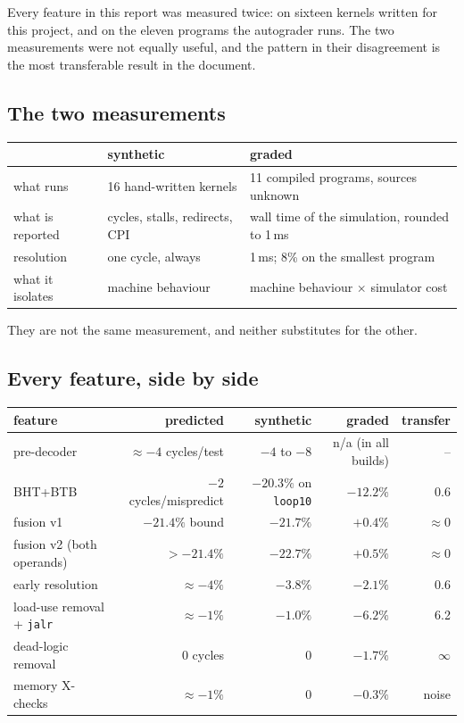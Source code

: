\documentclass[11pt]{article}
\begin{document}
Every feature in this report was measured twice: on sixteen kernels written for this project, and
on the eleven programs the autograder runs. The two measurements were not equally useful, and the
pattern in their disagreement is the most transferable result in the document.

\subsection{The two measurements}

\begin{center}
\small
\begin{tabular}{lll}
\toprule
& synthetic & graded \\
\midrule
what runs & 16 hand-written kernels & 11 compiled programs, sources unknown \\
what is reported & cycles, stalls, redirects, CPI & wall time of the simulation, rounded to 1\,ms \\
resolution & one cycle, always & 1\,ms; 8\% on the smallest program \\
what it isolates & machine behaviour & machine behaviour $\times$ simulator cost \\
\bottomrule
\end{tabular}
\end{center}

They are not the same measurement, and neither substitutes for the other.

\subsection{Every feature, side by side}

\begin{center}
\footnotesize
\setlength{\tabcolsep}{4pt}
\begin{tabular}{lrrrr}
\toprule
feature & predicted & synthetic & graded & transfer \\
\midrule
pre-decoder                    & $\approx$$-4$ cycles/test & $-4$ to $-8$ & n/a (in all builds) & -- \\
BHT+BTB                        & $-2$ cycles/mispredict & $-20.3\%$ on \texttt{loop10} & $-12.2\%$ & 0.6 \\
fusion v1                      & $-21.4\%$ bound & $-21.7\%$ & $+0.4\%$ & $\approx 0$ \\
fusion v2 (both operands)      & $>-21.4\%$ & $-22.7\%$ & $+0.5\%$ & $\approx 0$ \\
early resolution               & $\approx -4\%$ & $-3.8\%$ & $-2.1\%$ & 0.6 \\
load-use removal + \texttt{jalr} & $\approx -1\%$ & $-1.0\%$ & $-6.2\%$ & 6.2 \\
dead-logic removal             & $0$ cycles & $0$ & $-1.7\%$ & $\infty$ \\
memory X-checks                & $\approx -1\%$ & $0$ & $-0.3\%$ & noise \\
\bottomrule
\end{tabular}
\end{center}
\end{document}
